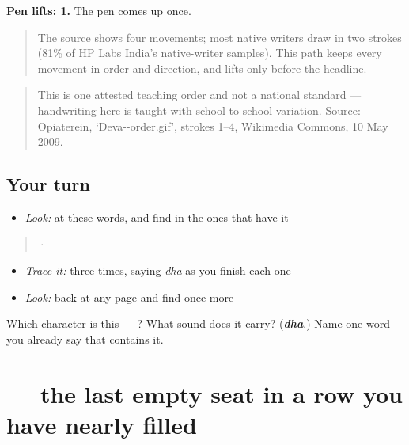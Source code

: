 \textbf{Pen lifts: 1.} The pen comes up once.

\begin{quote}
The source shows four movements; most native writers draw  in two strokes (81\% of HP Labs India's native-writer samples). This path keeps every movement in order and direction, and lifts only before the headline.
\end{quote}

\begin{quote}
This is one attested teaching order and not a national standard — handwriting here is taught with school-to-school variation. Source: Opiaterein, ‘Deva--order.gif’, strokes 1–4, Wikimedia Commons, 10 May 2009.
\end{quote}

\subsection*{Your turn}
\begin{itemize}
\raggedright
  \item \emph{Look:} at these words, and find  in the ones that have it
\end{itemize}

\begin{quote}
  ·  
\end{quote}

\begin{itemize}
\raggedright
  \item \emph{Trace it:}  three times, saying \emph{dha} as you finish each one
  \item \emph{Look:} back at any page and find  once more
\end{itemize}

\begin{tcolorbox}[breakable,colback=teal!4,colframe=teal!35!black,title={Before you move on}]
Which character is this — ? What sound does it carry? (\emph{\textbf{dha}}.) Name one word you already say that contains it.
\end{tcolorbox}
\section[\texorpdfstring{\hi{थ} (tha)}{थ (tha)}]{ — the last empty seat in a row you have nearly filled}

\label{lesson:HI-S126-letter-tha}



